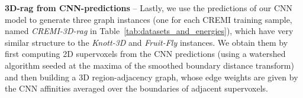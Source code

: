 \textbf{3D-rag from CNN-predictions} -- Lastly, we use the predictions of our CNN model to generate three graph instances (one for each CREMI training sample, named \emph{CREMI-3D-rag} in Table~\ref{tab:datasets_and_energies}), which have very similar structure to the \emph{Knott-3D} and \emph{Fruit-Fly} instances.  We obtain them by first computing 2D supervoxels from the CNN predictions (using a watershed algorithm seeded at the maxima of the smoothed boundary distance transform) and then building a 3D region-adjacency graph, whose edge weights are given by the CNN affinities averaged over the boundaries of adjacent supervoxels.






 







